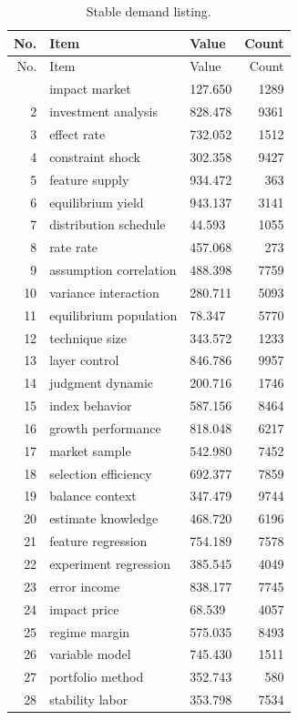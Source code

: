 \documentclass[11pt]{report}
\begin{document}
\begin{longtable}{rllr}\caption{Stable demand listing.}\label{tab:l11}\\\toprule No. & Item & Value & Count \\ \midrule \endfirsthead\toprule No. & Item & Value & Count \\ \midrule \endhead\bottomrule \endfoot
1 & impact market & 127.650 & 1289 \\
2 & investment analysis & 828.478 & 9361 \\
3 & effect rate & 732.052 & 1512 \\
4 & constraint shock & 302.358 & 9427 \\
5 & feature supply & 934.472 & 363 \\
6 & equilibrium yield & 943.137 & 3141 \\
7 & distribution schedule & 44.593 & 1055 \\
8 & rate rate & 457.068 & 273 \\
9 & assumption correlation & 488.398 & 7759 \\
10 & variance interaction & 280.711 & 5093 \\
11 & equilibrium population & 78.347 & 5770 \\
12 & technique size & 343.572 & 1233 \\
13 & layer control & 846.786 & 9957 \\
14 & judgment dynamic & 200.716 & 1746 \\
15 & index behavior & 587.156 & 8464 \\
16 & growth performance & 818.048 & 6217 \\
17 & market sample & 542.980 & 7452 \\
18 & selection efficiency & 692.377 & 7859 \\
19 & balance context & 347.479 & 9744 \\
20 & estimate knowledge & 468.720 & 6196 \\
21 & feature regression & 754.189 & 7578 \\
22 & experiment regression & 385.545 & 4049 \\
23 & error income & 838.177 & 7745 \\
24 & impact price & 68.539 & 4057 \\
25 & regime margin & 575.035 & 8493 \\
26 & variable model & 745.430 & 1511 \\
27 & portfolio method & 352.743 & 580 \\
28 & stability labor & 353.798 & 7534 \\

\end{longtable}
\end{document}
